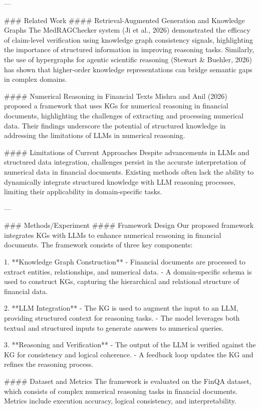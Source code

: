 ---

### Related Work  
#### Retrieval-Augmented Generation and Knowledge Graphs  
The MedRAGChecker system (Ji et al., 2026) demonstrated the efficacy of claim-level verification using knowledge graph consistency signals, highlighting the importance of structured information in improving reasoning tasks. Similarly, the use of hypergraphs for agentic scientific reasoning (Stewart & Buehler, 2026) has shown that higher-order knowledge representations can bridge semantic gaps in complex domains.

#### Numerical Reasoning in Financial Texts  
Mishra and Anil (2026) proposed a framework that uses KGs for numerical reasoning in financial documents, highlighting the challenges of extracting and processing numerical data. Their findings underscore the potential of structured knowledge in addressing the limitations of LLMs in numerical reasoning.

#### Limitations of Current Approaches  
Despite advancements in LLMs and structured data integration, challenges persist in the accurate interpretation of numerical data in financial documents. Existing methods often lack the ability to dynamically integrate structured knowledge with LLM reasoning processes, limiting their applicability in domain-specific tasks.

---

### Methods/Experiment  
#### Framework Design  
Our proposed framework integrates KGs with LLMs to enhance numerical reasoning in financial documents. The framework consists of three key components:

1. **Knowledge Graph Construction**  
   - Financial documents are processed to extract entities, relationships, and numerical data.  
   - A domain-specific schema is used to construct KGs, capturing the hierarchical and relational structure of financial data.  

2. **LLM Integration**  
   - The KG is used to augment the input to an LLM, providing structured context for reasoning tasks.  
   - The model leverages both textual and structured inputs to generate answers to numerical queries.  

3. **Reasoning and Verification**  
   - The output of the LLM is verified against the KG for consistency and logical coherence.  
   - A feedback loop updates the KG and refines the reasoning process.

#### Dataset and Metrics  
The framework is evaluated on the FinQA dataset, which consists of complex numerical reasoning tasks in financial documents. Metrics include execution accuracy, logical consistency, and interpretability.

